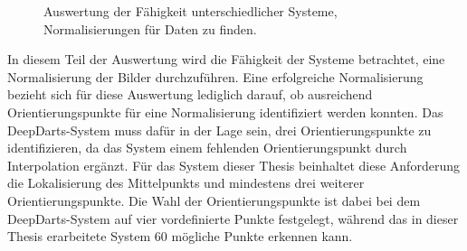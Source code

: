 \begin{figure}
    \centering
    \caption{Auswertung der Fähigkeit unterschiedlicher Systeme, Normalisierungen für Daten zu finden.}
    \label{fig:cv_normalisierung}
\end{figure}

In diesem Teil der Auswertung wird die Fähigkeit der Systeme betrachtet, eine Normalisierung der Bilder durchzuführen. Eine erfolgreiche Normalisierung bezieht sich für diese Auswertung lediglich darauf, ob ausreichend Orientierungspunkte für eine Normalisierung identifiziert werden konnten. Das DeepDarts-System muss dafür in der Lage sein, drei Orientierungspunkte zu identifizieren, da das System einem fehlenden Orientierungspunkt durch Interpolation ergänzt. Für das System dieser Thesis beinhaltet diese Anforderung die Lokalisierung des Mittelpunkts und mindestens drei weiterer Orientierungspunkte. Die Wahl der Orientierungspunkte ist dabei bei dem DeepDarts-System auf vier vordefinierte Punkte festgelegt, während das in dieser Thesis erarbeitete System 60 mögliche Punkte erkennen kann.


